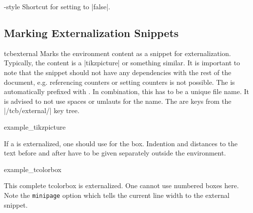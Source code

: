 \begin{extTcbKey}[][doc new and updated={2015-06-12}{2017-02-24}]{-}{}{style}
  Shortcut for setting  to |false|.
\end{extTcbKey}


\subsection{Marking Externalization Snippets}\label{subsec:external_marking}

\begin{docEnvironment}[doc new=2015-03-11]{tcbexternal}{}
Marks the environment content as a snippet for externalization.
Typically, the content is a |tikzpicture| or something similar.
It is important to note that the snippet should not have any dependencies
with the rest of the document, e.g. referencing counters or setting counters
is not possible.
The  is automatically prefixed with .
In combination, this has to be a unique file name. It is advised to not
use spaces or umlauts for the name.
The  are keys from the |/tcb/external/| key tree.

\begin{dispExample}
\begin{tcbexternal}{example_tikzpicture}
\end{tcbexternal}
\end{dispExample}

\medskip

If a  is externalized, one should use
 for the box. Indention and distances to
the text before and after have to be given separately outside the
 environment.

\begin{dispExample}
\noindent%
\begin{tcbexternal}[minipage]{example_tcolorbox}
  \begin{tcolorbox}[nobeforeafter,enhanced,
      fonttitle=\bfseries,title=Externalized Box,
      colframe=red!50!black,drop fuzzy shadow,
      interior style={fill overzoom image=goldshade.png}]
    This complete tcolorbox is externalized. One cannot use numbered
    boxes here. Note the \texttt{minipage} option which tells the
    current line width to the external snippet.
  \end{tcolorbox}
\end{tcbexternal}
\end{dispExample}


\end{docEnvironment}
